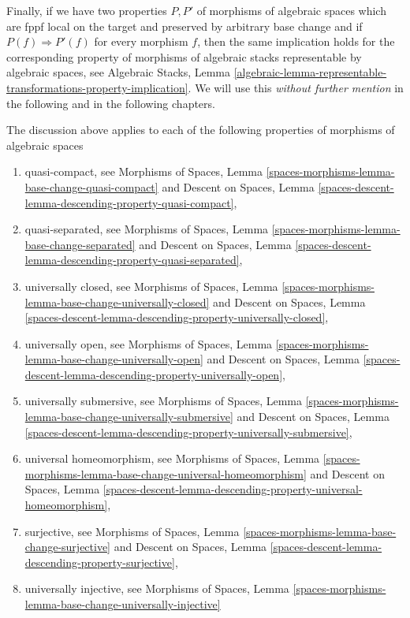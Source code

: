 \medskip\noindent
Finally, if we have two properties $P, P'$ of morphisms of algebraic spaces
which are fppf local on the target and preserved by arbitrary base change
and if $P(f) \Rightarrow P'(f)$ for every morphism $f$, then the same
implication holds for the corresponding property of morphisms of algebraic
stacks representable by algebraic spaces, see
Algebraic Stacks, Lemma
\ref{algebraic-lemma-representable-transformations-property-implication}.
We will use this {\it without further mention} in the following and in the
following chapters.

\medskip\noindent
The discussion above applies to each of the following properties of
morphisms of algebraic spaces
\begin{enumerate}
\item quasi-compact, see
Morphisms of Spaces,
Lemma \ref{spaces-morphisms-lemma-base-change-quasi-compact}
and
Descent on Spaces,
Lemma \ref{spaces-descent-lemma-descending-property-quasi-compact},
\item quasi-separated, see
Morphisms of Spaces,
Lemma \ref{spaces-morphisms-lemma-base-change-separated}
and
Descent on Spaces,
Lemma \ref{spaces-descent-lemma-descending-property-quasi-separated},
\item universally closed, see
Morphisms of Spaces,
Lemma \ref{spaces-morphisms-lemma-base-change-universally-closed}
and
Descent on Spaces,
Lemma \ref{spaces-descent-lemma-descending-property-universally-closed},
\item universally open, see
Morphisms of Spaces,
Lemma \ref{spaces-morphisms-lemma-base-change-universally-open}
and
Descent on Spaces,
Lemma \ref{spaces-descent-lemma-descending-property-universally-open},
\item universally submersive, see
Morphisms of Spaces,
Lemma \ref{spaces-morphisms-lemma-base-change-universally-submersive}
and
Descent on Spaces,
Lemma \ref{spaces-descent-lemma-descending-property-universally-submersive},
\item universal homeomorphism, see
Morphisms of Spaces,
Lemma \ref{spaces-morphisms-lemma-base-change-universal-homeomorphism}
and
Descent on Spaces,
Lemma \ref{spaces-descent-lemma-descending-property-universal-homeomorphism},
\item surjective, see
Morphisms of Spaces,
Lemma \ref{spaces-morphisms-lemma-base-change-surjective}
and
Descent on Spaces,
Lemma \ref{spaces-descent-lemma-descending-property-surjective},
\item universally injective, see
Morphisms of Spaces,
Lemma \ref{spaces-morphisms-lemma-base-change-universally-injective}

\end{enumerate}

